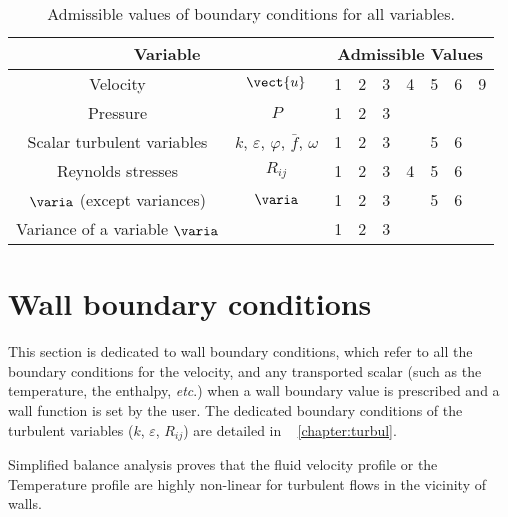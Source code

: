 \begin{table}
\begin{center}
\begin{tabular}{||c|c||p{}|p{}|p{}|p{}|p{}|p{}|p{}||}
\hline
\multicolumn{2}{||c||}{Variable}
        &\multicolumn{7}{c||}{Admissible Values}\\
\hline
Velocity                                & $\vect{u}$                                                                         &  1& 2& 3& 4& 5& 6& 9 \\
Pressure                                & $P$                                                                                   &  1& 2& 3&  &  & & \\
Scalar turbulent variables     & $k$, $\varepsilon$, $\varphi$, $\bar{f}$, $\omega$        &  1& 2& 3&  & 5& 6& \\
Reynolds stresses                & $R_{ij}$                                                                              &  1& 2& 3& 4& 5& 6& \\
$\varia$ (except variances)  &  $\varia$                                                                           &  1& 2& 3&  & 5& 6& \\
Variance of a variable $\varia$ &                                                                                      &  1& 2& 3&  &  & & \\
\hline
\end{tabular}
\end{center}
\caption{Admissible values of boundary conditions for all variables.}\label{tab:ICODCLadm_condli}
\end{table}


\section{Wall boundary conditions}\label{sec:clptur}

This section is dedicated to wall boundary conditions, 
which refer to all the boundary conditions for the velocity, and any transported scalar (such as the temperature, the enthalpy, \emph{etc}.) 
when a wall boundary value is prescribed and a wall function is set by the user. The dedicated boundary conditions of the turbulent variables ($k$, $\varepsilon$, $R_{ij}$) are detailed in \chaptername~ \ref{chapter:turbul}.

Simplified balance analysis proves that the fluid velocity profile or the Temperature profile are 
highly non-linear  for turbulent flows in the vicinity of walls.

